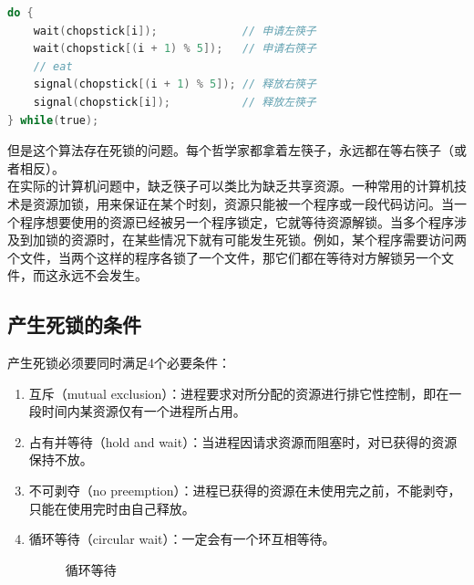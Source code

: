 \begin{lstlisting}[language=C]
do {
	wait(chopstick[i]);				// 申请左筷子
	wait(chopstick[(i + 1) % 5]);	// 申请右筷子
	// eat
	signal(chopstick[(i + 1) % 5]); // 释放右筷子
	signal(chopstick[i]);			// 释放左筷子
} while(true);
\end{lstlisting}

但是这个算法存在死锁的问题。每个哲学家都拿着左筷子，永远都在等右筷子（或者相反）。\\

在实际的计算机问题中，缺乏筷子可以类比为缺乏共享资源。一种常用的计算机技术是资源加锁，用来保证在某个时刻，资源只能被一个程序或一段代码访问。当一个程序想要使用的资源已经被另一个程序锁定，它就等待资源解锁。当多个程序涉及到加锁的资源时，在某些情况下就有可能发生死锁。例如，某个程序需要访问两个文件，当两个这样的程序各锁了一个文件，那它们都在等待对方解锁另一个文件，而这永远不会发生。\\

\subsection{产生死锁的条件}

产生死锁必须要同时满足4个必要条件：

\begin{enumerate}
    \item 互斥（mutual exclusion）：进程要求对所分配的资源进行排它性控制，即在一段时间内某资源仅有一个进程所占用。

    \item 占有并等待（hold and wait）：当进程因请求资源而阻塞时，对已获得的资源保持不放。

    \item 不可剥夺（no preemption）：进程已获得的资源在未使用完之前，不能剥夺，只能在使用完时由自己释放。

    \item 循环等待（circular wait）：一定会有一个环互相等待。

          \begin{figure}[H]
              \centering
              \caption{循环等待}
          \end{figure}
\end{enumerate}

